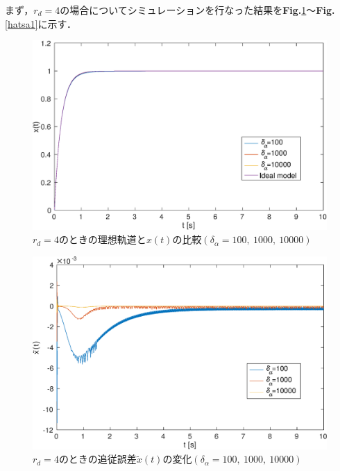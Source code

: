 \documentclass[a4paper,12pt]{jarticle}
\begin{document}
まず，$ r_d = 4 $の場合についてシミュレーションを行なった結果を{\bf Fig.}{\ref{xa1}}〜{\bf Fig.}{\ref{hatsa1}}に示す．
\begin{figure}[H]
 \begin{center}
  \includegraphics[scale=0.485]{../figure/eps/estimate/1/x.eps}
  \caption{$ r_d = 4 $のときの理想軌道と$ x(t) $の比較$(\delta_{\alpha} = 100, ~ 1000, ~ 10000 )$}
  \label{xa1}
 \end{center}
\end{figure}
\begin{figure}[H]
 \begin{center}
  \includegraphics[scale=0.5]{../figure/eps/estimate/1/tilde_x.eps}
  \caption{$ r_d = 4 $のときの追従誤差$ \tilde{x}(t) $の変化$(\delta_{\alpha} = 100, ~ 1000, ~ 10000 )$}
  \label{tilde_xa1}
 \end{center}
\end{figure}
\end{document}
